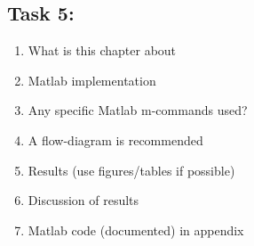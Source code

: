 \subsection{Task 5: }

\begin{enumerate}[i]
    \item What is this chapter about
    \item Matlab implementation
    \item Any specific Matlab m-commands used?
    \item A flow-diagram is recommended
    \item Results (use figures/tables if possible)
    \item Discussion of results
    \item Matlab code (documented) in appendix
\end{enumerate}





